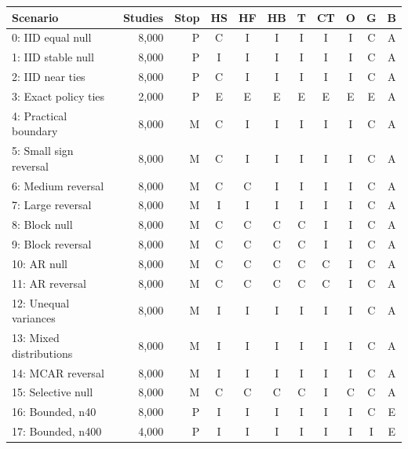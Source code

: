 \begin{tabular}{lrrcccccccc}\toprule
Scenario & Studies & Stop & HS & HF & HB & T & CT & O & G & B \\ \midrule
0: IID equal null & 8,000 & P & C & I & I & I & I & I & C & A \\
1: IID stable null & 8,000 & P & I & I & I & I & I & I & C & A \\
2: IID near ties & 8,000 & P & C & I & I & I & I & I & C & A \\
3: Exact policy ties & 2,000 & P & E & E & E & E & E & E & E & A \\
4: Practical boundary & 8,000 & M & C & I & I & I & I & I & C & A \\
5: Small sign reversal & 8,000 & M & C & I & I & I & I & I & C & A \\
6: Medium reversal & 8,000 & M & C & C & I & I & I & I & C & A \\
7: Large reversal & 8,000 & M & I & I & I & I & I & I & C & A \\
8: Block null & 8,000 & M & C & C & C & C & I & I & C & A \\
9: Block reversal & 8,000 & M & C & C & C & C & I & I & C & A \\
10: AR null & 8,000 & M & C & C & C & C & C & I & C & A \\
11: AR reversal & 8,000 & M & C & C & C & C & C & I & C & A \\
12: Unequal variances & 8,000 & M & I & I & I & I & I & I & C & A \\
13: Mixed distributions & 8,000 & M & I & I & I & I & I & I & C & A \\
14: MCAR reversal & 8,000 & M & I & I & I & I & I & I & C & A \\
15: Selective null & 8,000 & M & C & C & C & C & I & C & C & A \\
16: Bounded, n40 & 8,000 & P & I & I & I & I & I & I & C & E \\
17: Bounded, n400 & 4,000 & P & I & I & I & I & I & I & I & E \\
\bottomrule\end{tabular}
